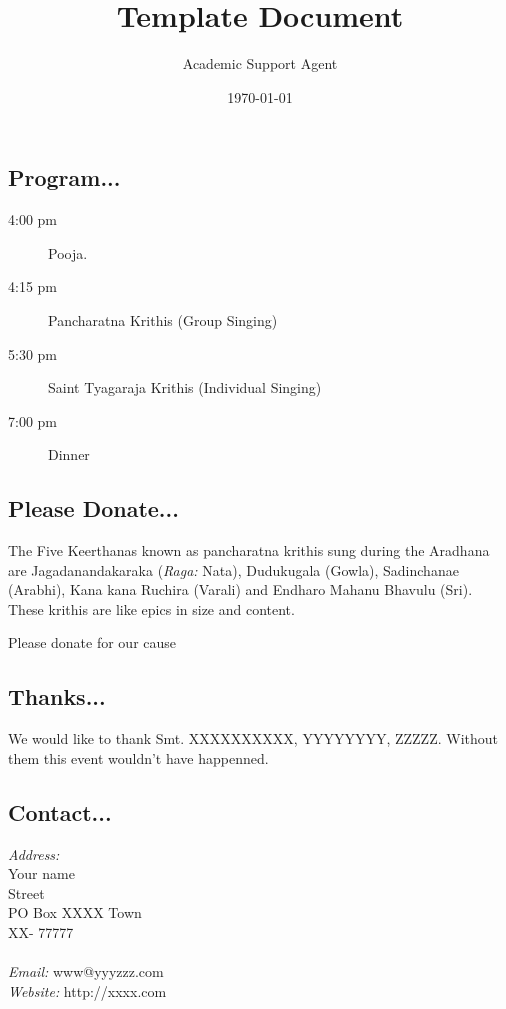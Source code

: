 \documentclass{article}
\title{Template Document}
\author{Academic Support Agent}
\date{\today}
\begin{document}
\maketitle

\begin{framed}

\subsection*{Program...}
\begin{description}
\item[4:00 pm] Pooja. 
\item[4:15 pm] Pancharatna Krithis (Group Singing)
\item[5:30 pm] Saint Tyagaraja Krithis (Individual Singing)
\item[7:00 pm] Dinner  
\end{description}


\subsection*{Please Donate...}
The Five Keerthanas known as  pancharatna krithis  
sung during the Aradhana are Jagadanandakaraka ({\em Raga:} Nata), 
Dudukugala (Gowla), Sadinchanae (Arabhi), 
Kana kana Ruchira (Varali) and Endharo Mahanu Bhavulu (Sri).
These krithis are like epics in size and content.

Please donate for our cause


\subsection*{Thanks...}
We would like to thank Smt. XXXXXXXXXX,
YYYYYYYY, ZZZZZ. Without them this event 
wouldn't have happenned.


\subsection*{Contact...}
{\em Address:}\\
Your name\\
Street\\
PO Box XXXX Town\\
XX- 77777\\\\
{\em Email:} www@yyyzzz.com\\
{\em Website:} http://xxxx.com

\end{framed}
\end{document}

